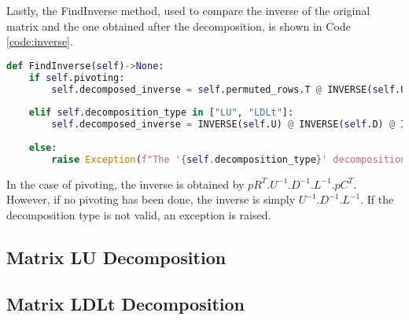 Lastly, the FindInverse method, used to compare the inverse of the original matrix and the one obtained after the decomposition, is shown in Code \ref{code:inverse}.
\begin{lstlisting}[language=Python, caption={FindInverse method.}, label={code:inverse}]
def FindInverse(self)->None:
    if self.pivoting:
        self.decomposed_inverse = self.permuted_rows.T @ INVERSE(self.U) @ INVERSE(self.D) @ INVERSE(self.L) @ self.permuted_cols.T
    
    elif self.decomposition_type in ["LU", "LDLt"]:
        self.decomposed_inverse = INVERSE(self.U) @ INVERSE(self.D) @ INVERSE(self.L)
    
    else:
        raise Exception(f"The '{self.decomposition_type}' decomposition is not valid.")
\end{lstlisting}

In the case of pivoting, the inverse is obtained by $pR^T.U^{-1}.D^{-1}.L^{-1}.pC^T$. However, if no pivoting has been done, the inverse is simply $U^{-1}.D^{-1}.L^{-1}$. If the decomposition type is not valid, an exception is raised.

\subsection{Matrix LU Decomposition} \label{sec:lu}

\subsection{Matrix LDLt Decomposition} \label{sec:ldlt}